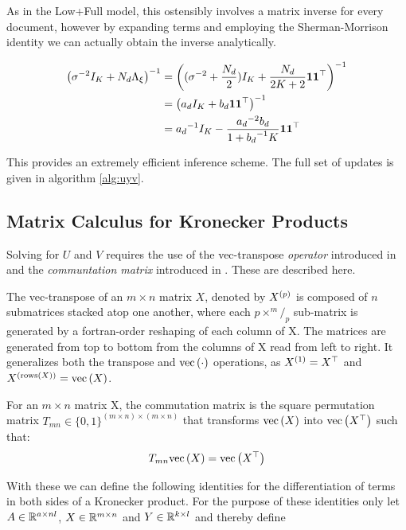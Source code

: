 As in the Low+Full model, this ostensibly involves a matrix inverse for every document, however by expanding terms and employing the Sherman-Morrison identity we can actually obtain the inverse analytically.

\begin{align}
{\left( \sigma^{-2}I_K + N_d  { \Lambda_{\xi} } \right)}^{-1}
& = {\left( (\sigma^{-2} + \frac{N_d}{2})I_K + \frac{N_d}{2K + 2} \mathbf{1} \mathbf{1}^\top \right)}^{-1} \\
& = {\left( a_d I_K + b_d \mathbf{1}\mathbf{1}^\top \right)}^{-1} \\
& = {a_d}^{-1} I_K - \frac{{a_d}^{-2}b_d }{1 + {b_d}^{-1}K}\mathbf{1}\mathbf{1}^\top
\end{align}

This provides an extremely efficient inference scheme. The full set of updates is given in algorithm \ref{alg:uyv}.

\newcommand \mvy  { \vv{m}_{\vv{y}} }
\newcommand \sigvy { { S_Y } }

\newcommand \mmy  { M_Y      }
\newcommand \omy  { \Omega_Y }
\newcommand \sigy { \Sigma_Y }

\subsection*{Matrix Calculus for Kronecker Products}
Solving for $U$ and $V$ requires the use of the vec-transpose \emph{operator} introduced in \cite{Wandell1992} and the \emph {communtation matrix} introduced in \cite{Magnus1988}. These are described here.

The vec-transpose of an $m \times n$ matrix $X$, denoted by ${ X^{(p)} }$ is composed of $n$ submatrices stacked atop one another, where each $p \times ^m/_p$ sub-matrix is generated by a fortran-order reshaping of each column of X. The matrices are generated from top to bottom from the columns of X read from left to right. It generalizes both the transpose and $\text{vec}\left(\cdot\right)$ operations, as ${ X^{(1)} } = X^\top$ and ${ X^{(\text{rows}(X))} } = \text{vec}\left(X\right)$.

For an $m \times n$ matrix X, the commutation matrix is the square permutation matrix $T_{mn} \in \{0,1\}^{(m \times n) \times (m \times n)}$ that transforms $\text{vec}\left(X\right)$ into $\text{vec}\left(X^\top\right)$ such that:
\begin{equation}
T_{mn} \text{vec}\left(X\right) = \text{vec}\left(X^\top\right)
\end{equation}

With these we can define the following identities for the differentiation of terms in both sides of a Kronecker product. For the purpose of these identities only let $A \in { \mathbb{R}^{a \times nl} }$, $X \in { \mathbb{R}^{m \times n} }$ and $Y \in { \mathbb{R}^{k \times l} }$ and thereby define

